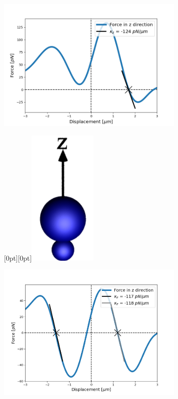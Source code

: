 \begin{figure}[h!]
	\centering
	\begin{subfigure}{.65\linewidth}
		\includegraphics[width=\linewidth]{lam=2_theta=0.png}
		\caption{}
		\label{lam=2}
	\end{subfigure}\hfill %
	\begin{subfigure}{.25\linewidth}
		\centering
		\raisebox{50pt}[0pt][0pt]{\makebox{}\includegraphics[width=0.3\linewidth, keepaspectratio]{theta=0.png}}
		\caption{}
		\label{large over small}
	\end{subfigure}
	\medskip
	\begin{subfigure}{.65\linewidth}
		\includegraphics[width=\linewidth]{lam=2_theta=180.png}

\end{subfigure}
\end{figure}

